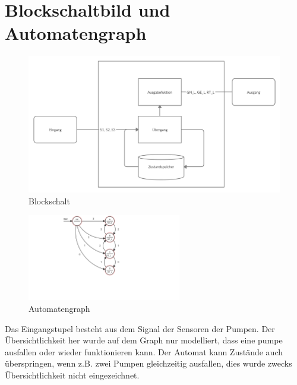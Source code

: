\section{Blockschaltbild und Automatengraph}

\begin{figure}[H]
    \begin{center}
        \includegraphics[width=1\textwidth]{img/Blockschalt.png}
        \caption{Blockschalt}
        \label{fig:A1_Block}
    \end{center}
\end{figure}


\begin{figure}[H]
    \begin{center}
        \includegraphics[width=0.6\textwidth]{img/Motortemp2.png}
        \caption{Automatengraph}
        \label{fig:A1_Auto}
    \end{center}
\end{figure}

Das Eingangstupel besteht aus dem Signal der Sensoren der Pumpen. Der Übersichtlichkeit her wurde auf dem Graph nur modelliert, dass eine pumpe ausfallen oder wieder funktionieren kann.
Der Automat kann Zustände auch überspringen, wenn z.B. zwei Pumpen gleichzeitig ausfallen, dies wurde zwecks Übersichtlichkeit nicht eingezeichnet.\\
 
